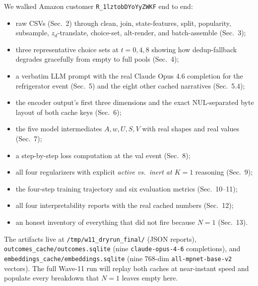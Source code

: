 \documentclass[11pt,a4paper]{article}
\begin{document}
We walked Amazon customer \texttt{R\_1lztobDYoYyZWKF} end to end:
\begin{itemize}
\item raw CSVs (Sec.~2) through clean, join, state-features, split,
popularity, subsample, $z_d$-translate, choice-set, alt-render, and
batch-assemble (Sec.~3);
\item three representative choice sets at $t = 0, 4, 8$ showing how
dedup-fallback degrades gracefully from empty to full pools (Sec.~4);
\item a verbatim LLM prompt with the real Claude Opus 4.6 completion
for the refrigerator event (Sec.~5) and the eight other cached
narratives (Sec.~5.4);
\item the encoder output's first three dimensions and the exact
NUL-separated byte layout of both cache keys (Sec.~6);
\item the five model intermediates $A, w, U, S, V$ with real shapes
and real values (Sec.~7);
\item a step-by-step loss computation at the val event (Sec.~8);
\item all four regularizers with explicit \emph{active vs.\ inert at
$K = 1$} reasoning (Sec.~9);
\item the four-step training trajectory and six evaluation metrics
(Sec.~10--11);
\item all four interpretability reports with the real cached numbers
(Sec.~12);
\item an honest inventory of everything that did not fire because
$N = 1$ (Sec.~13).
\end{itemize}

The artifacts live at \texttt{/tmp/w11\_dryrun\_final/} (JSON
reports), \texttt{outcomes\_cache/outcomes.sqlite} (nine
\texttt{claude-opus-4-6} completions), and
\texttt{embeddings\_cache/embeddings.sqlite} (nine 768-dim
\texttt{all-mpnet-base-v2} vectors). The full Wave-11 run will replay
both caches at near-instant speed and populate every breakdown that
$N = 1$ leaves empty here.
\end{document}
